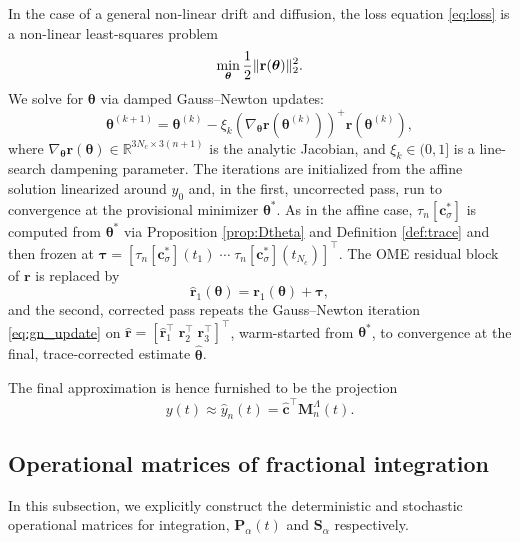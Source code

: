 \documentclass[11pt, a4paper]{article}
\theoremstyle{theoremstyle}
\theoremstyle{definitionstyle}
\DeclarePairedDelimiter{\norm}{\lVert}{\rVert}
\begin{document}
In the case of a general non-linear drift and diffusion, the loss equation \eqref{eq:loss} is a non-linear least-squares problem
\begin{equation}
    \min_{\boldsymbol \theta} \frac 12 \norm{\mathbf r(\boldsymbol \theta)}_2^2.
\end{equation}
We solve for $\boldsymbol \theta$ via damped Gauss--Newton updates:
\begin{equation}\label{eq:gn_update}
    \boldsymbol \theta^{(k+1)} = \boldsymbol \theta^{(k)} - \xi_k (\nabla_{\boldsymbol \theta} \mathbf r(\boldsymbol \theta^{(k)}))^+ \mathbf r(\boldsymbol \theta^{(k)}),
\end{equation}
where $\nabla_{\boldsymbol \theta} \mathbf r(\boldsymbol \theta) \in \mathbb R^{3N_c \times 3(n+1)}$ is the analytic Jacobian, and $\xi_k \in (0, 1]$ is a line-search dampening parameter. The iterations are initialized from the affine solution linearized around $y_0$ and, in the first, uncorrected pass, run to convergence at the provisional minimizer $\boldsymbol \theta^*$. As in the affine case, $\tau_n[\mathbf c_\sigma^*]$ is computed from $\boldsymbol \theta^*$ via Proposition \ref{prop:Dtheta} and Definition \ref{def:trace} and then frozen at $\boldsymbol \tau = [\tau_n[\mathbf c_\sigma^*](t_1) \; \cdots \; \tau_n[\mathbf c_\sigma^*](t_{N_c})]^\top$. The OME residual block of $\mathbf r$ is replaced by
\begin{equation}\label{eq:gn_corrected_residual}
    \hat{\mathbf r}_1(\boldsymbol \theta) = \mathbf r_1(\boldsymbol \theta) + \boldsymbol \tau,
\end{equation}
and the second, corrected pass repeats the Gauss--Newton iteration \eqref{eq:gn_update} on $\hat{\mathbf r} = [\hat{\mathbf r}_1^\top \; \mathbf r_2^\top \; \mathbf r_3^\top]^\top$, warm-started from $\boldsymbol \theta^*$, to convergence at the final, trace-corrected estimate $\hat{\boldsymbol \theta}$.

The final approximation is hence furnished to be the projection
\begin{equation}
    y(t) \approx \hat y_n(t) = \hat{\mathbf c}^\top \mathbf M_n^\Lambda(t).
\end{equation}

\subsection{Operational matrices of fractional integration}
In this subsection, we explicitly construct the deterministic and stochastic operational matrices for integration, $\mathbf P_\alpha (t)$ and $\mathbf S_\alpha$ respectively.
\end{document}
